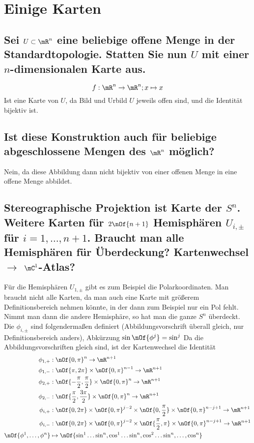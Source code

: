 \section{Einige Karten}

\subsection{Sei $U \subset \mR^n$ eine beliebige offene Menge in der Standardtopologie. Statten Sie nun $U$ mit einer $n$-dimensionalen Karte aus.}
\begin{equation}
	f : \mR^n \to \mR^n; x \mapsto x
\end{equation}
Ist eine Karte von $U$, da Bild und Urbild $U$ jeweils offen sind, und die Identität bijektiv ist.

\subsection{Ist diese Konstruktion auch für beliebige abgeschlossene Mengen des $\mR^n$ möglich?}
Nein, da diese Abbildung dann nicht bijektiv von einer offenen Menge in eine offene Menge abbildet.

\subsection{Stereographische Projektion ist Karte der $S^n$. Weitere Karten für $2\nOf{n+1}$ Hemisphären $U_{i,\pm}$ für $i = 1,\dots,n+1$. Braucht man alle Hemisphären für Überdeckung? Kartenwechsel $\rightarrow$ $\mC^1$-Atlas?}
Für die Hemisphären $U_{1,\pm}$ gibt es zum Beispiel die Polarkoordinaten.
Man braucht nicht alle Karten, da man auch eine Karte mit größerem Definitionsbereich nehmen könnte, in der dann zum Beispiel nur ein Pol fehlt. Nimmt man dann die andere Hemisphäre, so hat man die ganze $S^n$ überdeckt. 
Die $\phi_{i,\pm}$ sind folgendermaßen definiert (Abbildungsvorschrift überall gleich, nur Definitionsbereich anders), Abkürzung $\sin\nOf{\phi^j} = \sin^j$ Da die Abbildungsvorschriften gleich sind, ist der Kartenwechsel die Identität
\begin{align}
	\phi_{1,+}&: \nOf{0,\pi}^n \to \mR^{n+1}\\
	\phi_{1,-}&: \nOf{\pi,2\pi}\times\nOf{0,\pi}^{n-1} \to \mR^{n+1}\\
	\phi_{2,+}&:	\nOf{-\frac{\pi}{2},\frac{\pi}{2}}\times\nOf{0,\pi}^n \to \mR^{n+1}\\
	\phi_{2,-}&:	\nOf{\frac{\pi}{2},\frac{3\pi}{2}}\times\nOf{0,\pi}^n \to \mR^{n+1}\\
	\phi_{i,+}&: \nOf{0,2\pi}\times\nOf{0,\pi}^{j-2}\times\nOf{0,\frac{\pi}{2}}\times\nOf{0,\pi}^{n-j+1} \to \mR^{n+1}\\
	\phi_{i,-}&: \nOf{0,2\pi}\times\nOf{0,\pi}^{j-2}\times\nOf{\frac{\pi}{2},\pi}\times\nOf{0,\pi}^{n-j+1} \to \mR^{n+1}\\
	\nOf{\phi^1,\dots,\phi^n} &\mapsto \nOf{\sin^1\dots\sin^n,\cos^1\dots\sin^n,\cos^2\dots\sin^n,\dots,\cos^n}
\end{align}
